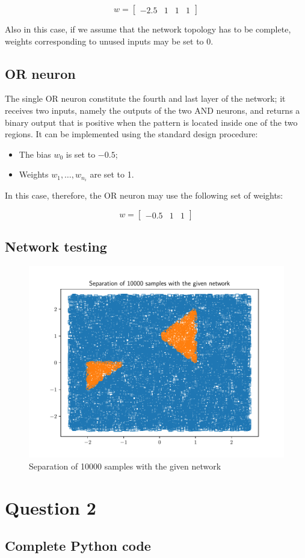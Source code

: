 \documentclass[letterpaper,headings=standardclasses]{scrartcl}
\begin{document}
$$ w = [\begin{matrix} -2.5 & 1 & 1 & 1 \end{matrix}] $$

Also in this case, if we assume that the network topology has to be complete, weights corresponding to unused inputs may be set to 0.

\subsection{OR neuron}

The single OR neuron constitute the fourth and last layer of the network; it receives two inputs, namely the outputs of the two AND neurons, and returns a binary output that is positive when the pattern is located inside one of the two regions. It can be implemented using the standard design procedure:

\begin{itemize}

\item The bias $w_0$ is set to $-0.5$;

\item Weights $w_1,\dots,w_{n_i}$ are set to 1.

\end{itemize}

In this case, therefore, the OR neuron may use the following set of weights:

$$ w = [\begin{matrix} -0.5 & 1 & 1 \end{matrix}] $$

\subsection{Network testing}

\begin{figure}[H]
\centering
\includegraphics[width=.7\linewidth]{sep_10000.pdf}
\caption{Separation of 10000 samples with the given network}
\label{sep_10000}
\end{figure}

\section{Question 2}

\subsection{Complete Python code}


\end{document}
